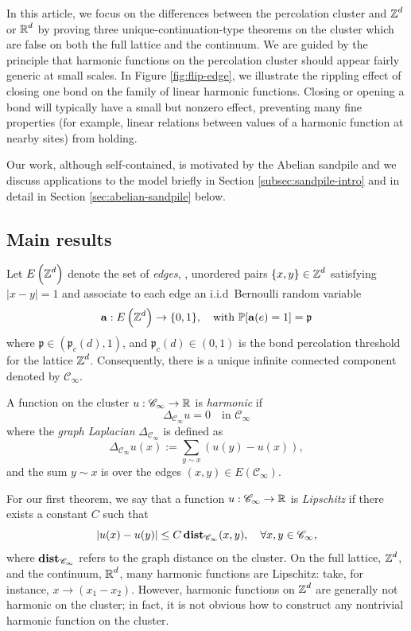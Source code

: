 \documentclass[12pt]{amsart}
\numberwithin{equation}{section}
\begin{document}
	In this article, we focus on the differences between the percolation cluster and $\operatorname{\mathbb{Z}}^d$ or $\operatorname{\mathbb{R}}^d$ by proving three unique-continuation-type theorems on the cluster which are false on both the full lattice and the continuum. We are guided by the principle that harmonic functions on the percolation cluster should appear fairly generic at small scales. In Figure \ref{fig:flip-edge}, we illustrate the rippling effect of closing one bond on the family of linear harmonic functions. Closing or opening a bond will typically have a small but nonzero effect, preventing many fine properties (for example, linear relations between values of a harmonic function at nearby sites) from holding. 
	
	Our work, although self-contained, is motivated by the Abelian sandpile \cite{levine-what-is, levine-peres-survey}  and we discuss applications to the model briefly in Section \ref{subsec:sandpile-intro} and in detail in Section \ref{sec:abelian-sandpile} below. 
	
	\subsection{Main results}
	Let $E\left( \operatorname{\mathbb{Z}}^d \right)$ denote the set of {\it edges}, \ie, unordered pairs $\{x,y\} \in \operatorname{\mathbb{Z}}^d$ satisfying $|x-y| =1$ and associate to each edge
	an i.i.d\ Bernoulli random variable 
	\[
	\mathbf{a}: E\left( \operatorname{\mathbb{Z}}^d \right) \to \{0, 1\}, \quad \mbox{with } \mathbb P[\mathbf{a}(e) = 1] = \mathfrak{p}
	\]
	where $\mathfrak{p} \in (\mathfrak{p}_c(d), 1)$, and $\mathfrak{p}_c(d) \in (0,1)$ is the bond percolation threshold for the lattice $\operatorname{\mathbb{Z}}^d$. 
	Consequently, there is a unique infinite connected component denoted by $\mathscr{C}_{\infty}$.  
	
	
	
	A function on the cluster $u: \mathscr{C}_{\infty} \to \operatorname{\mathbb{R}}$ is {\it harmonic} if 
	\begin{equation}
		\Delta_{{\mathscr{C}_{\infty}}} u = 0 \quad \mbox{in $\mathscr{C}_{\infty}$} 
	\end{equation}
	where the {\it graph Laplacian} $\Delta_{\mathscr{C}_{\infty}}$ is defined as
	\begin{equation}
		\Delta_{{\mathscr{C}_{\infty}}} u(x) := \sum_{y \sim x} (u(y) - u(x)), 
	\end{equation}
	and the sum $y \sim x$ is over the edges $(x,y) \in E \left( \mathscr{C}_\infty \right)$.
	
	
	
	
	For our first theorem, we say that a function $u: \mathscr{C}_{\infty} \to \operatorname{\mathbb{R}}$ is {\it Lipschitz} if there exists a constant $C$ such that
	\begin{equation} \label{eq:lipschitz-def}
		|u(x) - u(y)| \leq C \operatorname{\mathop{\bf dist{}}}_{\mathscr{C}_{\infty}}(x,y), \quad \forall x,y \in \mathscr{C}_{\infty},
	\end{equation}
	where $\operatorname{\mathop{\bf dist{}}}_{\mathscr{C}_{\infty}}$ refers to the graph distance on the cluster. 
	On the full lattice, $\operatorname{\mathbb{Z}}^d$, and the continuum, $\operatorname{\mathbb{R}}^d$, many harmonic functions are Lipschitz: take, for instance, $x \to (x_1 - x_2)$. However, harmonic functions on $\operatorname{\mathbb{Z}}^d$ are generally not harmonic
	on the cluster; in fact, it is not obvious how to construct any nontrivial harmonic function on the cluster.  
	
\end{document}
